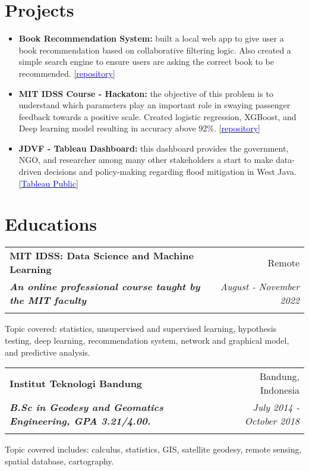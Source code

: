 \documentclass[a4paper, 11pt]{article}
\makeatletter
\newcommand{\resumeItem}[2]{
    \item\small{
        \textbf{#1}{#2 \vspace{-2pt}}
    }
}
\newcommand{\resumeSubheading}[4]{
    \vspace{-1pt}
    \begin{tabular*}{0.97\textwidth}{l@{\extracolsep{\fill}}r}
        \color{lightblue}\textbf{#1} & #2 \\
        \textbf{\textit{\small#3}} & \textit{\small #4} \\
        \textnormal{}\vspace{-5pt}
    \end{tabular*}\vspace{-5pt}
}
\newcommand{\resumeSubHeadingListEnd}{\end{itemize}}
\newcommand{\resumeItemListStart}{\begin{itemize}[leftmargin=*]\setlength\itemsep{0em}\vspace{-1pt}}
\newcommand{\resumeItemListEnd}{\end{itemize}\vspace{-5pt}}
\makeatother
\begin{document}

    \vspace{-5pt}
    \section{Projects}

    \resumeItemListStart
    \resumeItem{Book Recommendation System:}{ built a local web app to give user a book recommendation based on collaborative filtering logic.
    Also created a simple search engine to ensure users are asking the correct book to be recommended. 
    \href{https://github.com/amrirasyidi/book_recommendation}{[\textcolor{blue}{repository}]}}
    \resumeItem{MIT IDSS Course - Hackaton:}{ the objective of this problem is to understand which parameters play an important role in swaying
    passenger feedback towards a positive scale. Created logistic regression, XGBoost, and Deep learning model resulting in accuracy
    above 92\%. 
    \href{https://github.com/amrirasyidi/mit_idss_hackaton}{[\textcolor{blue}{repository}]}}
    \resumeItem{JDVF - Tableau Dashboard:}{ this dashboard provides the government, NGO, and researcher among many other stakeholders a start
    to make data-driven decisions and policy-making regarding flood mitigation in West Java. 
    \href{https://public.tableau.com/app/profile/faisal.putra/viz/Book1_16671939458310/DashboardFINAL}{[\textcolor{blue}{Tableau Public}]}}
    \resumeItemListEnd
    
    \vspace{-5pt}
    \section{Educations}

    \resumeSubheading
    {MIT IDSS: Data Science and Machine Learning}
    {Remote}
    {An online professional course taught by the MIT faculty}
    {August - November 2022}
    {Topic covered: statistics, unsupervised and supervised learning, hypothesis testing, 
    deep learning, recommendation system, network and graphical model, and predictive analysis.}
    
    \vspace{5pt}
    \resumeSubheading
    {Institut Teknologi Bandung}
    {Bandung, Indonesia}
    {B.Sc in Geodesy and Geomatics Engineering, GPA 3.21/4.00.}
    {July 2014 - October 2018}
    {Topic covered includes: calculus, statistics, GIS, satellite geodesy, 
    remote sensing, spatial database, cartography.}
\end{document}
